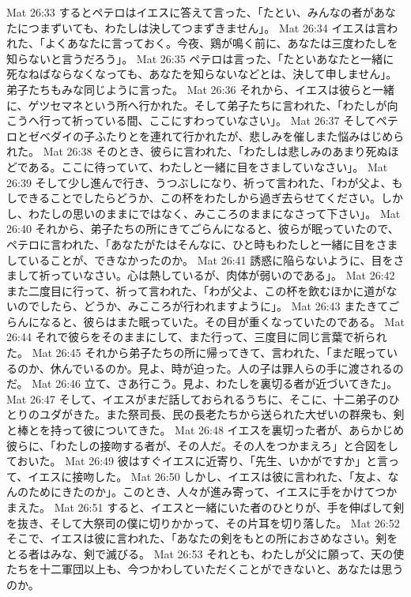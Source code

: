 Mat 26:33  するとペテロはイエスに答えて言った、「たとい、みんなの者があなたにつまずいても、わたしは決してつまずきません」。
Mat 26:34  イエスは言われた、「よくあなたに言っておく。今夜、鶏が鳴く前に、あなたは三度わたしを知らないと言うだろう」。
Mat 26:35  ペテロは言った、「たといあなたと一緒に死なねばならなくなっても、あなたを知らないなどとは、決して申しません」。弟子たちもみな同じように言った。
Mat 26:36  それから、イエスは彼らと一緒に、ゲツセマネという所へ行かれた。そして弟子たちに言われた、「わたしが向こうへ行って祈っている間、ここにすわっていなさい」。
Mat 26:37  そしてペテロとゼベダイの子ふたりとを連れて行かれたが、悲しみを催しまた悩みはじめられた。
Mat 26:38  そのとき、彼らに言われた、「わたしは悲しみのあまり死ぬほどである。ここに待っていて、わたしと一緒に目をさましていなさい」。
Mat 26:39  そして少し進んで行き、うつぶしになり、祈って言われた、「わが父よ、もしできることでしたらどうか、この杯をわたしから過ぎ去らせてください。しかし、わたしの思いのままにではなく、みこころのままになさって下さい」。
Mat 26:40  それから、弟子たちの所にきてごらんになると、彼らが眠っていたので、ペテロに言われた、「あなたがたはそんなに、ひと時もわたしと一緒に目をさましていることが、できなかったのか。
Mat 26:41  誘惑に陥らないように、目をさまして祈っていなさい。心は熱しているが、肉体が弱いのである」。
Mat 26:42  また二度目に行って、祈って言われた、「わが父よ、この杯を飲むほかに道がないのでしたら、どうか、みこころが行われますように」。
Mat 26:43  またきてごらんになると、彼らはまた眠っていた。その目が重くなっていたのである。
Mat 26:44  それで彼らをそのままにして、また行って、三度目に同じ言葉で祈られた。
Mat 26:45  それから弟子たちの所に帰ってきて、言われた、「まだ眠っているのか、休んでいるのか。見よ、時が迫った。人の子は罪人らの手に渡されるのだ。
Mat 26:46  立て、さあ行こう。見よ、わたしを裏切る者が近づいてきた」。
Mat 26:47  そして、イエスがまだ話しておられるうちに、そこに、十二弟子のひとりのユダがきた。また祭司長、民の長老たちから送られた大ぜいの群衆も、剣と棒とを持って彼についてきた。
Mat 26:48  イエスを裏切った者が、あらかじめ彼らに、「わたしの接吻する者が、その人だ。その人をつかまえろ」と合図をしておいた。
Mat 26:49  彼はすぐイエスに近寄り、「先生、いかがですか」と言って、イエスに接吻した。
Mat 26:50  しかし、イエスは彼に言われた、「友よ、なんのためにきたのか」。このとき、人々が進み寄って、イエスに手をかけてつかまえた。
Mat 26:51  すると、イエスと一緒にいた者のひとりが、手を伸ばして剣を抜き、そして大祭司の僕に切りかかって、その片耳を切り落した。
Mat 26:52  そこで、イエスは彼に言われた、「あなたの剣をもとの所におさめなさい。剣をとる者はみな、剣で滅びる。
Mat 26:53  それとも、わたしが父に願って、天の使たちを十二軍団以上も、今つかわしていただくことができないと、あなたは思うのか。
